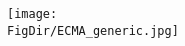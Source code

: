 \begin{figure}
  \centerline{\texttt{[image: \\FigDir/ECMA\_generic.jpg]}}
\label{fig:ECMA_generic}
\end{figure}